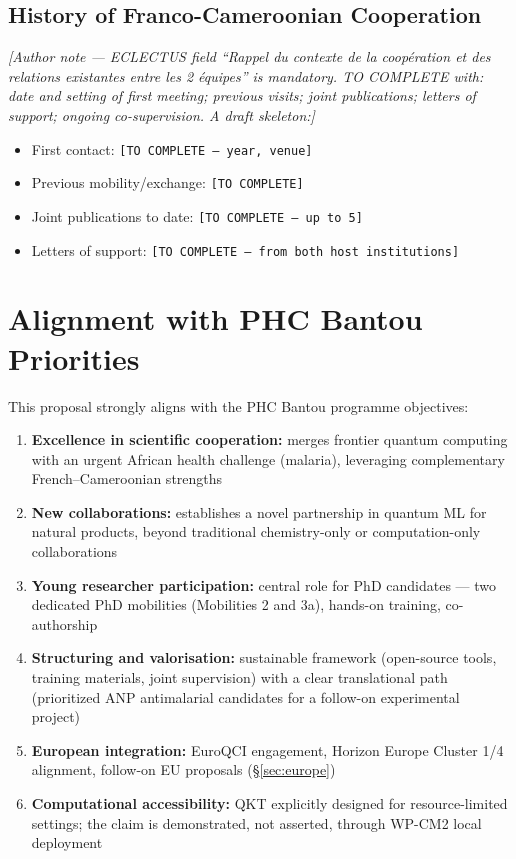 \documentclass[11pt,a4paper]{article}
\begin{document}
\subsection{History of Franco-Cameroonian Cooperation}

\textit{[Author note --- ECLECTUS field ``Rappel du contexte de la coopération et des relations existantes entre les 2 équipes'' is mandatory. TO COMPLETE with: date and setting of first meeting; previous visits; joint publications; letters of support; ongoing co-supervision. A draft skeleton:]}
\begin{itemize}
    \item First contact: \texttt{[TO COMPLETE --- year, venue]}
    \item Previous mobility/exchange: \texttt{[TO COMPLETE]}
    \item Joint publications to date: \texttt{[TO COMPLETE --- up to 5]}
    \item Letters of support: \texttt{[TO COMPLETE --- from both host institutions]}
\end{itemize}

\section{Alignment with PHC Bantou Priorities}

This proposal strongly aligns with the PHC Bantou programme objectives:

\begin{enumerate}
    \item \textbf{Excellence in scientific cooperation:} merges frontier quantum computing with an urgent African health challenge (malaria), leveraging complementary French--Cameroonian strengths
    \item \textbf{New collaborations:} establishes a novel partnership in quantum ML for natural products, beyond traditional chemistry-only or computation-only collaborations
    \item \textbf{Young researcher participation:} central role for PhD candidates --- two dedicated PhD mobilities (Mobilities 2 and 3a), hands-on training, co-authorship
    \item \textbf{Structuring and valorisation:} sustainable framework (open-source tools, training materials, joint supervision) with a clear translational path (prioritized ANP antimalarial candidates for a follow-on experimental project)
    \item \textbf{European integration:} EuroQCI engagement, Horizon Europe Cluster 1/4 alignment, follow-on EU proposals (\S\ref{sec:europe})
    \item \textbf{Computational accessibility:} QKT explicitly designed for resource-limited settings; the claim is demonstrated, not asserted, through WP-CM2 local deployment
\end{enumerate}
\end{document}

